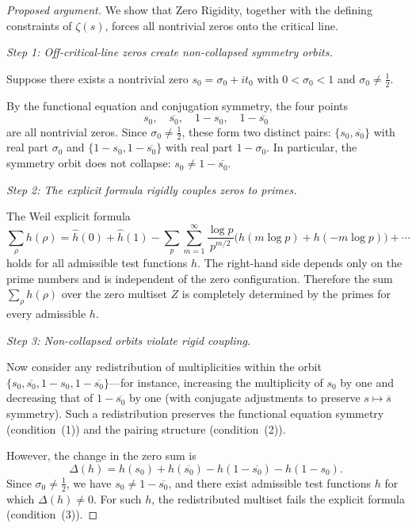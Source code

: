 \documentclass{article}
\theoremstyle{definition}
\begin{document}
\begin{proof}[Proposed argument]
We show that Zero Rigidity, together with the defining constraints of 
$\zeta(s)$, forces all nontrivial zeros onto the critical line.

\medskip
\noindent
\emph{Step 1: Off-critical-line zeros create non-collapsed symmetry orbits.}

Suppose there exists a nontrivial zero $s_0 = \sigma_0 + it_0$ with 
$0 < \sigma_0 < 1$ and $\sigma_0 \neq \tfrac{1}{2}$.

By the functional equation and conjugation symmetry, the four points
\[
s_0,\quad \overline{s_0},\quad 1-s_0,\quad 1-\overline{s_0}
\]
are all nontrivial zeros. Since $\sigma_0 \neq \tfrac{1}{2}$, these 
form two distinct pairs: $\{s_0, \overline{s_0}\}$ with real part 
$\sigma_0$ and $\{1-s_0, 1-\overline{s_0}\}$ with real part 
$1-\sigma_0$. In particular, the symmetry orbit does not collapse: 
$s_0 \neq 1-\overline{s_0}$.

\medskip
\noindent
\emph{Step 2: The explicit formula rigidly couples zeros to primes.}

The Weil explicit formula
\[
\sum_\rho h(\rho) = \widehat{h}(0) + \widehat{h}(1)
- \sum_p \sum_{m=1}^{\infty} \frac{\log p}{p^{m/2}}
\bigl(h(m\log p) + h(-m\log p)\bigr) + \cdots
\]
holds for all admissible test functions $h$. The right-hand side 
depends only on the prime numbers and is independent of the zero 
configuration. Therefore the sum $\sum_\rho h(\rho)$ over the zero 
multiset $Z$ is completely determined by the primes for every 
admissible $h$.

\medskip
\noindent
\emph{Step 3: Non-collapsed orbits violate rigid coupling.}

Now consider any redistribution of multiplicities within the orbit 
$\{s_0, \overline{s_0}, 1-s_0, 1-\overline{s_0}\}$---for instance, 
increasing the multiplicity of $s_0$ by one and decreasing that of 
$1-\overline{s_0}$ by one (with conjugate adjustments to preserve 
$s \mapsto \overline{s}$ symmetry). Such a redistribution preserves the 
functional equation symmetry (condition~(1)) and the pairing structure 
(condition~(2)).

However, the change in the zero sum is
\[
\Delta(h) = h(s_0) + h(\overline{s_0}) - h(1-\overline{s_0}) - h(1-s_0).
\]
Since $\sigma_0 \neq \tfrac{1}{2}$, we have $s_0 \neq 1-\overline{s_0}$, 
and there exist admissible test functions $h$ for which $\Delta(h) \neq 0$. 
For such $h$, the redistributed multiset fails the explicit formula 
(condition~(3)).


\end{proof}
\end{document}
